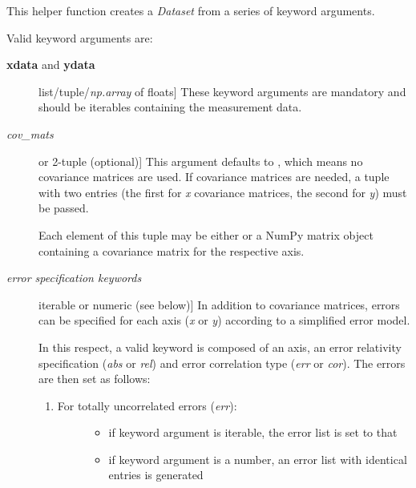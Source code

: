 \documentclass[a4paper,10pt,english]{sphinxmanual}
\begin{document}
\begin{fulllineitems}
\label{index:kafe.dataset.build_dataset}
This helper function creates a \emph{Dataset} from a series of keyword
arguments.

Valid keyword arguments are:
\begin{description}
\item[{\textbf{xdata} and \textbf{ydata}}] \leavevmode{[}list/tuple/\emph{np.array} of floats{]}
These keyword arguments are mandatory and should be iterables
containing the measurement data.

\item[{\emph{cov\_mats}}] \leavevmode{[} or 2-tuple (optional){]}
This argument defaults to , which means no covariance matrices
are used. If covariance matrices are needed, a tuple with two entries
(the first for \emph{x} covariance matrices, the second for \emph{y}) must be
passed.

Each element of this tuple may be either  or a NumPy matrix
object containing a covariance matrix for the respective axis.

\item[{\emph{error specification keywords}}] \leavevmode{[}iterable or numeric (see below){]}
In addition to covariance matrices, errors can be specified for each
axis (\emph{x} or \emph{y}) according to a simplified error model.

In this respect, a valid keyword is composed of an axis, an error
relativity specification (\emph{abs} or \emph{rel}) and error correlation type
(\emph{err} or \emph{cor}). The errors are then set as follows:
\begin{enumerate}
\item {} \begin{description}
\item[{For totally uncorrelated errors (\emph{err}):}] \leavevmode\begin{itemize}
\item {} 
if keyword argument is iterable, the error list is set to that

\item {} 
if keyword argument is a number, an error list with identical entries is generated

\end{itemize}

\end{description}


\end{enumerate}
\end{description}
\end{fulllineitems}
\end{document}
